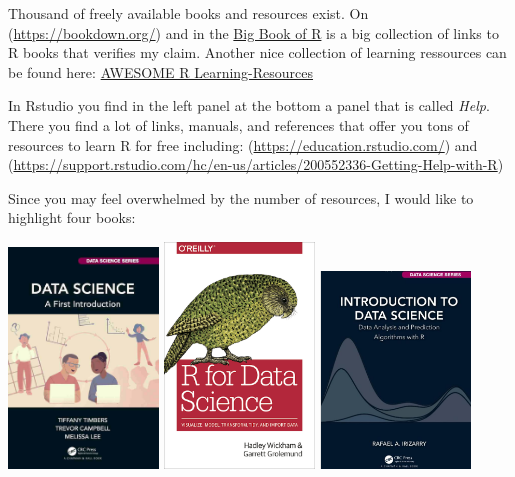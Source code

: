\documentclass[
  12pt,
  oneside]{book}
\begin{document}
Thousand of freely available books and resources exist. On (\url{https://bookdown.org/}) and in the \href{www.bigbookofr.com}{Big Book of R} is a big collection of links to R books that verifies my claim. Another nice collection of learning ressources can be found here:
\href{https://github.com/iamericfletcher/awesome-r-learning-resources}{AWESOME R Learning-Resources}

In Rstudio you find in the left panel at the bottom a panel that is called \emph{Help}. There you find a lot of links, manuals, and references that offer you tons of resources to learn R for free including:
(\url{https://education.rstudio.com/})
and (\url{https://support.rstudio.com/hc/en-us/articles/200552336-Getting-Help-with-R})

Since you may feel overwhelmed by the number of resources, I would like to highlight four books:

\includegraphics[width=0.3\textwidth,height=\textheight]{fig/ds-a-first-intro-cover.jpg}
\includegraphics[width=0.3\textwidth,height=\textheight]{fig/rfordatas.png}
\includegraphics[width=0.3\textwidth,height=\textheight]{fig/irizarrybook.png}
\end{document}
